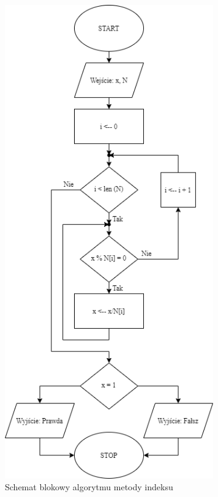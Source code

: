 \documentclass[]{article}
\begin{document}
	\begin{figure}[h]
	\begin{center}
		\includegraphics[width=9cm]{./img/3.png}
		\caption{Schemat blokowy algorytmu metody indeksu}
	\end{center}
\end{figure}
\end{document}
